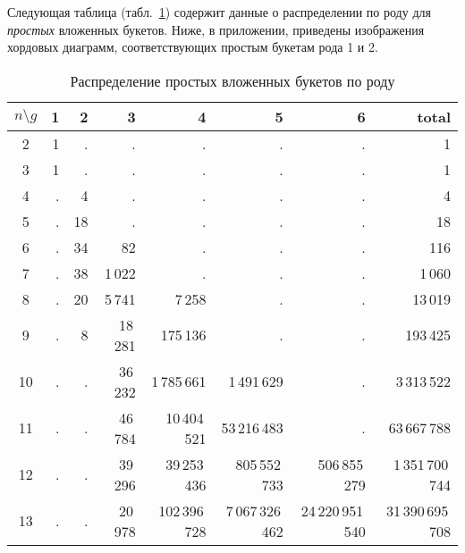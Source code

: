 \documentclass[a4paper,12pt]{article}
\theoremstyle{plain}
\theoremstyle{definition}
\begin{document}
Следующая таблица (табл.~\ref{table:prime}) содержит данные о распределении по роду для \textit{простых} вложенных букетов.
Ниже, в приложении, приведены изображения хордовых диаграмм, соответствующих простым букетам рода 1 и 2.
\begin{table}[!t]\footnotesize
\caption{\small Распределение простых вложенных букетов по роду\label{table:prime}} \centering
\begin{tabular}{|c||r|r|r|r|r|r||r|}
\hline
$n \setminus g$ &  1 &  2 &  3 &  4 &  5  & 6  & total\\\hline\hline
2  &  1  &   .   &  .      &   .          &   .           &  .            &                    1                   \\
3  &  1  &   .   &  .      &   .          &   .           &  .            &                    1                   \\
4  &  .  &   4   &  .      &   .          &   .           &  .            &                    4                   \\
5  &  .  &   18  &  .      &   .          &   .           &  .            &                    18                  \\
6  &  .  &   34  &  82     &   .          &   .           &  .            &                    116                 \\
7  &  .  &   38  &  1\,022   &   .          &   .           &  .            &                  1\,060              \\
8  &  .  &   20  &  5\,741   &   7\,258       &   .           &  .            &                13\,019             \\
9  &  .  &   8   &  18\,281  &   175\,136     &   .           &  .            &                193\,425            \\
10 &  .  &   .   &  36\,232  &   1\,785\,661    &   1\,491\,629     &  .            &          3\,313\,522         \\
11 &  .  &   .   &  46\,784  &   10\,404\,521   &   53\,216\,483    &  .            &          63\,667\,788        \\
12 &  .  &   .   &  39\,296  &   39\,253\,436   &   805\,552\,733   &  506\,855\,279    &      1\,351\,700\,744    \\
13 &  .  &   .   &  20\,978  &   102\,396\,728  &   7\,067\,326\,462  &  24\,220\,951\,540  &  31\,390\,695\,708   \\
\hline
\end{tabular}
\end{table}
\end{document}
